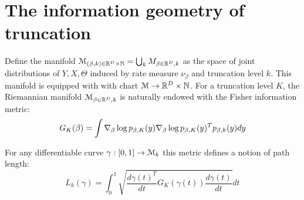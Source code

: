 \documentclass[letterpaper]{article}
\begin{document}
\section{The information geometry of truncation}

Define the manifold $\mathcal{M}_{(\beta,k)\in\mathbb{R}^D\times\mathbb{N}}=\bigcup_k M_{\beta\in\mathbb{R}^D,k}$ as the space of  joint distributions of $Y,X,\Theta$ induced by rate measure $\nu_\beta$ and truncation level $k$. This manifold is equipped with with chart $\mathcal{M}\rightarrow\mathbb{R}^D\times\mathbb{N}$.  For a truncation level $K$, the Riemannian manifold $\mathcal{M}_{\beta\in\mathbb{R}^D,k}$ is naturally endowed with the Fisher information metric:
\[
	G_K(\beta)=\int\nabla_\beta\log p_{\beta,K}(y)\nabla_\beta\log p_{\beta,K}(y)^Tp_{\beta,k}(y)dy
\]

For any differentiable curve $\gamma:[0,1]\rightarrow\mathcal{M}_k$ this metric defines a notion of path length:
\[
	L_k(\gamma)=\int_0^1\sqrt{\frac{d\gamma(t)^T}{dt}G_K(\gamma(t))\frac{d\gamma(t)}{dt}}dt
\]



{
\small


}
\end{document}
